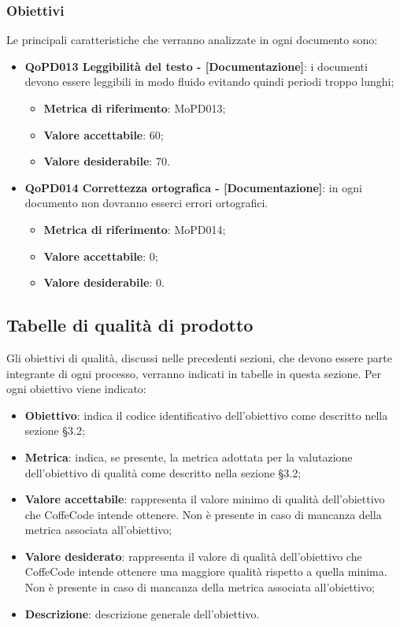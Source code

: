 \documentclass[../piano-di-qualifica.tex]{subfiles}
\begin{document}
\subsubsection{Obiettivi}
\label{sub:obiettivi}
Le principali caratteristiche che verranno analizzate in ogni documento sono:
\begin{itemize}
    \item \textbf{QoPD013 Leggibilità del testo - [Documentazione]}: i documenti devono essere leggibili in modo fluido evitando quindi periodi troppo lunghi;
        \begin{itemize}
            \item \textbf{Metrica di riferimento}: MoPD013;
            \item \textbf{Valore accettabile}: 60;
            \item \textbf{Valore desiderabile}: 70.
        \end{itemize}
    \item \textbf{QoPD014 Correttezza ortografica - [Documentazione]}: in ogni documento non dovranno esserci errori ortografici.
        \begin{itemize}
            \item \textbf{Metrica di riferimento}: MoPD014;
            \item \textbf{Valore accettabile}: 0;
            \item \textbf{Valore desiderabile}: 0.
        \end{itemize}
\end{itemize}

\subsection{Tabelle di qualità di prodotto}
\label{sub:tabelle_di_qualita_di_prodotto}
Gli obiettivi di qualità, discussi nelle precedenti sezioni, che devono essere parte integrante di ogni processo, verranno indicati in tabelle in questa sezione.
Per ogni obiettivo viene indicato:

\begin{itemize}
   \item \textbf{Obiettivo}: indica il codice identificativo dell'obiettivo come descritto nella sezione §3.2;
   \item \textbf{Metrica}: indica, se presente, la metrica adottata per la valutazione dell'obiettivo di qualità come descritto nella sezione §3.2;
   \item \textbf{Valore accettabile}: rappresenta il valore minimo di qualità dell'obiettivo che CoffeCode intende ottenere. Non è presente in caso di mancanza della metrica associata all'obiettivo;
   \item \textbf{Valore desiderato}: rappresenta il valore di qualità dell'obiettivo che CoffeCode intende ottenere una maggiore qualità rispetto a quella minima. Non è presente in caso di mancanza della metrica associata all'obiettivo;
   \item \textbf{Descrizione}: descrizione generale dell'obiettivo.
\end{itemize}
\end{document}
